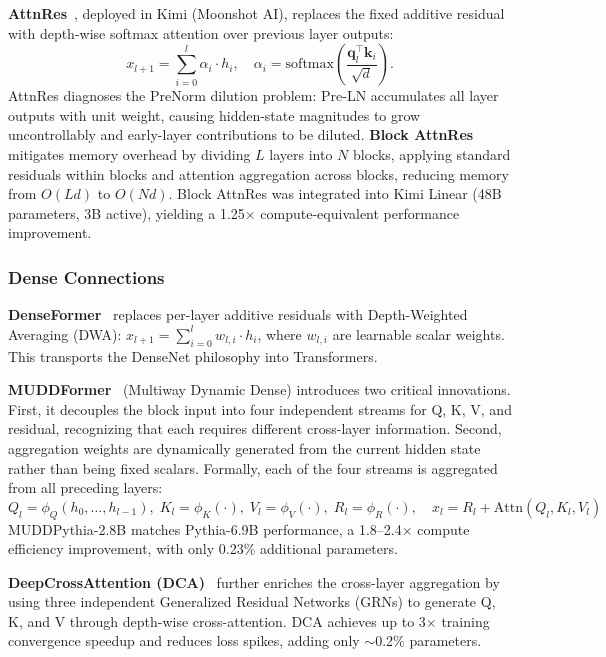 \textbf{AttnRes}~\cite{kimi2026attnres}, deployed in Kimi (Moonshot AI), replaces the fixed additive residual with depth-wise softmax attention over previous layer outputs:
\begin{equation}
  x_{l+1} = \sum_{i=0}^{l} \alpha_i \cdot h_i, \quad
  \alpha_i = \mathrm{softmax}\!\left(\frac{\mathbf{q}_l^\top \mathbf{k}_i}{\sqrt{d}}\right).
  \label{eq:attnres}
\end{equation}
AttnRes diagnoses the PreNorm dilution problem: Pre-LN accumulates all layer outputs with unit weight, causing hidden-state magnitudes to grow uncontrollably and early-layer contributions to be diluted. \textbf{Block AttnRes} mitigates memory overhead by dividing $L$ layers into $N$ blocks, applying standard residuals within blocks and attention aggregation across blocks, reducing memory from $O(Ld)$ to $O(Nd)$. Block AttnRes was integrated into Kimi Linear (48B parameters, 3B active), yielding a 1.25$\times$ compute-equivalent performance improvement.

\subsubsection{Dense Connections}

\textbf{DenseFormer}~\cite{pagliardini2024denseformer} replaces per-layer additive residuals with Depth-Weighted Averaging (DWA): $x_{l+1} = \sum_{i=0}^{l} w_{l,i} \cdot h_i$, where $w_{l,i}$ are learnable scalar weights. This transports the DenseNet philosophy into Transformers.

\textbf{MUDDFormer}~\cite{xiao2025muddformer} (Multiway Dynamic Dense) introduces two critical innovations. First, it decouples the block input into four independent streams for Q, K, V, and residual, recognizing that each requires different cross-layer information. Second, aggregation weights are dynamically generated from the current hidden state rather than being fixed scalars. Formally, each of the four streams is aggregated from all preceding layers:
\begin{equation}
Q_l = \phi_Q(h_0, \ldots, h_{l-1}), \; K_l = \phi_K(\cdot), \; V_l = \phi_V(\cdot), \; R_l = \phi_R(\cdot), \quad x_l = R_l + \mathrm{Attn}(Q_l, K_l, V_l)
\label{eq:muddformer}
\end{equation}
MUDDPythia-2.8B matches Pythia-6.9B performance, a 1.8--2.4$\times$ compute efficiency improvement, with only 0.23\% additional parameters.

\textbf{DeepCrossAttention (DCA)}~\cite{heddes2025deepcrossattention} further enriches the cross-layer aggregation by using three independent Generalized Residual Networks (GRNs) to generate Q, K, and V through depth-wise cross-attention. DCA achieves up to 3$\times$ training convergence speedup and reduces loss spikes, adding only $\sim$0.2\% parameters.

